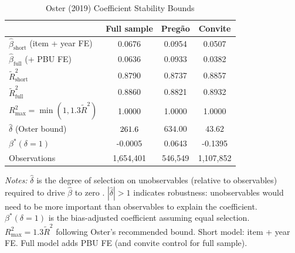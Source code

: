 \begin{table}[htbp]
\centering
\caption{Oster (2019) Coefficient Stability Bounds}
\label{tab:oster_delta}
\begin{threeparttable}
\small
\begin{tabular}{lccc}
\toprule
 & Full sample & Preg\~{a}o & Convite \\
\midrule
$\hat{\beta}_{\text{short}}$ (item + year FE) & 0.0676 & 0.0954 & 0.0507 \\
$\hat{\beta}_{\text{full}}$ (+ PBU FE) & 0.0636 & 0.0933 & 0.0382 \\
$\tilde{R}^2_{\text{short}}$ & 0.8790 & 0.8737 & 0.8857 \\
$\tilde{R}^2_{\text{full}}$ & 0.8860 & 0.8821 & 0.8932 \\
$R^2_{\max} = \min(1, 1.3 \tilde{R}^2)$ & 1.0000 & 1.0000 & 1.0000 \\
\midrule
$\hat{\delta}$ (Oster bound) & $261.6$ & $634.00$ & $43.62$ \\
$\beta^*(\delta = 1)$ & -0.0005 & 0.0643 & -0.1395 \\
Observations & 1,654,401 & 546,549 & 1,107,852 \\
\bottomrule
\end{tabular}
\begin{tablenotes}
\small
\item \textit{Notes:} $\hat{\delta}$ is the degree of selection on
unobservables (relative to observables) required to drive $\hat{\beta}$ to zero
\citep{oster2019unobservable}. $|\hat{\delta}| > 1$ indicates robustness:
unobservables would need to be more important than observables to explain
the coefficient. $\beta^*(\delta = 1)$ is the bias-adjusted coefficient
assuming equal selection. $R^2_{\max} = 1.3 \tilde{R}^2$ following
Oster's recommended bound. Short model: item + year FE. Full model adds
PBU FE (and convite control for full sample).
\end{tablenotes}
\end{threeparttable}
\end{table}
